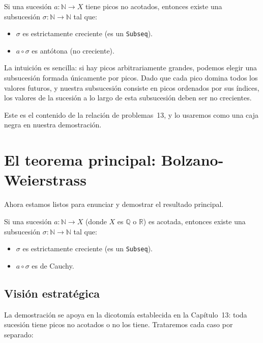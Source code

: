\begin{theorem}
  Si una sucesión $a : \mathbb{N} \to X$ tiene picos no acotados,
  entonces existe una subsucesión $\sigma : \mathbb{N} \to \mathbb{N}$
  tal que:
  \begin{itemize}
    \item $\sigma$ es estrictamente creciente (es un \texttt{Subseq}).
    \item $a \circ \sigma$ es antótona (no creciente).
  \end{itemize}
\end{theorem}

La intuición es sencilla: si hay picos arbitrariamente grandes, podemos
elegir una subsucesión formada únicamente por picos. Dado que cada pico
domina todos los valores futuros, y nuestra subsucesión consiste en
picos ordenados por sus índices, los valores de la sucesión a lo largo
de esta subsucesión deben ser no crecientes.

Este es el contenido de la relación de problemas~13, y lo usaremos como
una caja negra en nuestra demostración.

\section{El teorema principal: Bolzano-Weierstrass}

Ahora estamos listos para enunciar y demostrar el resultado principal.

\begin{theorem}
  Si una sucesión $a : \mathbb{N} \to X$ (donde $X$ es $\mathbb{Q}$ o
  $\mathbb{R}$) es acotada, entonces existe una subsucesión
  $\sigma : \mathbb{N} \to \mathbb{N}$ tal que:
  \begin{itemize}
    \item $\sigma$ es estrictamente creciente (es un \texttt{Subseq}).
    \item $a \circ \sigma$ es de Cauchy.
  \end{itemize}
\end{theorem}

\subsection{Visión estratégica}

La demostración se apoya en la dicotomía establecida en la
Capítulo~13: toda sucesión tiene picos no acotados o no los tiene.
Trataremos cada caso por separado:

